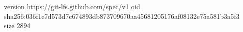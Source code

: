 version https://git-lfs.github.com/spec/v1
oid sha256:036f1e7d573d7c674893db873709670aa45681205176af08132e75a581b3a5f3
size 2894
